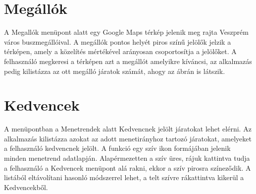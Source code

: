 \section {Megállók}
\label {megallok}
A Megallók menüpont alatt egy Google Maps térkép jelenik meg rajta Veszprém város buszmegállóival.
A megállók pontos helyét piros színű jelölők jelzik a térképen, amely a közelítés mértékével arányosan csoportosítja a jelölőket.
A felhasználó megkeresi a térképen azt a megállót amelyikre kíváncsi, az alkalmazás pedig kilistázza az ott megálló járatok számát, ahogy az  ábrán is látszik.

\section {Kedvencek}
\label {kedvencek}
A menüpontban a Menetrendek alatt Kedvencnek jelölt járatokat lehet elérni.
Az alkalmazás kilistázza azokat az adott menetirányhoz tartozó járatokat, amelyeket a felhasználó kedvencnek jelölt.
A funkció egy szív ikon formájában jelenik minden menetrend adatlapján.
Alapérmezetten a szív üres, rájuk kattintva tudja a felhasználó a Kedvencek menüpont alá rakni, ekkor a szív pirosra színeződik.
A listából eltávolítani hasonló módszerrel lehet, a telt szívre rákattintva kikerül a Kedvencekből.


